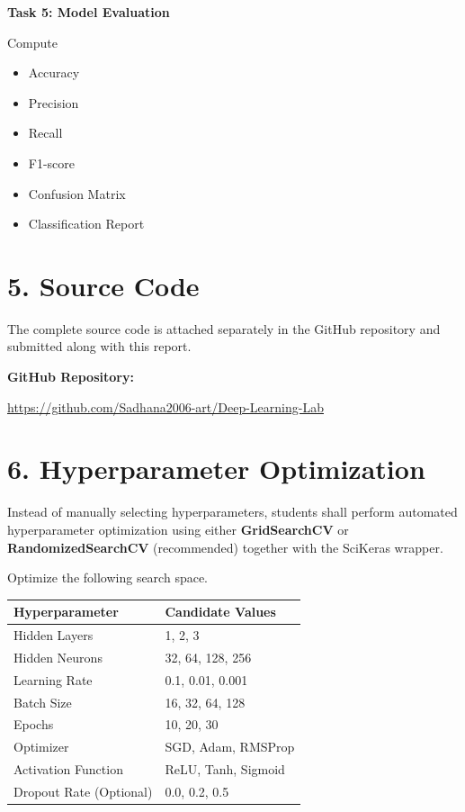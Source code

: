 \documentclass[11pt]{article}
\begin{document}
\bigskip

\textbf{Task 5: Model Evaluation}

Compute

\begin{itemize}
\item Accuracy
\item Precision
\item Recall
\item F1-score
\item Confusion Matrix
\item Classification Report
\end{itemize}

\section*{5. Source Code}

The complete source code is attached separately in the GitHub repository and submitted along with this report.

\textbf{GitHub Repository:}

\url{https://github.com/Sadhana2006-art/Deep-Learning-Lab}

\section*{6. Hyperparameter Optimization}

Instead of manually selecting hyperparameters, students shall perform automated hyperparameter optimization using either \textbf{GridSearchCV} or \textbf{RandomizedSearchCV} (recommended) together with the SciKeras wrapper.

Optimize the following search space.

\begin{center}
\begin{tabular}{|p{5cm}|p{7cm}|}
\hline
Hyperparameter & Candidate Values\\
\hline
Hidden Layers & 1, 2, 3\\
Hidden Neurons & 32, 64, 128, 256\\
Learning Rate & 0.1, 0.01, 0.001\\
Batch Size & 16, 32, 64, 128\\
Epochs & 10, 20, 30\\
Optimizer & SGD, Adam, RMSProp\\
Activation Function & ReLU, Tanh, Sigmoid\\
Dropout Rate (Optional) & 0.0, 0.2, 0.5\\
\hline
\end{tabular}
\end{center}
\end{document}
